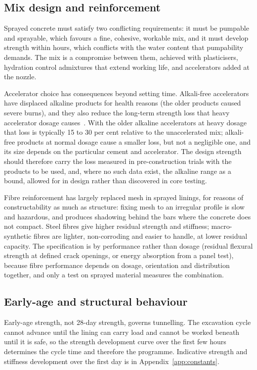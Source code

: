 \subsection{Mix design and reinforcement}
\label{sec:shotcrete-mix}

Sprayed concrete must satisfy two conflicting requirements: it must be pumpable
and sprayable, which favours a fine, cohesive, workable mix, and it must
develop strength within hours, which conflicts with the water content that
pumpability demands. The mix is a compromise between them, achieved with
plasticisers, hydration control admixtures that extend working life, and
accelerators added at the nozzle.

Accelerator choice has consequences beyond setting time. Alkali-free
accelerators have displaced alkaline products for health reasons (the older
products caused severe burns), and they also reduce the long-term strength
loss that heavy accelerator dosage causes~\citep{thomas2009scl}. With the
older alkaline accelerators at heavy dosage that loss is typically 15 to 30
per cent relative to the unaccelerated mix; alkali-free products at normal
dosage cause a smaller loss, but not a negligible one, and its size depends
on the particular cement and accelerator. The design strength should
therefore carry the loss measured in pre-construction trials with the
products to be used, and, where no such data exist, the alkaline range as a
bound, allowed for in design rather than discovered in core testing.

Fibre reinforcement has largely replaced mesh in sprayed linings, for reasons
of constructability as much as structure: fixing mesh to an irregular
profile is slow and hazardous, and produces shadowing behind the bars where the
concrete does not compact. Steel fibres give higher residual strength and
stiffness; macro-synthetic fibres are lighter, non-corroding and easier to
handle, at lower residual capacity. The specification is by performance rather than
dosage (residual flexural strength at defined crack openings, or
energy absorption from a panel test), because fibre performance depends on
dosage, orientation and distribution together, and only a test on sprayed
material measures the combination.

\subsection{Early-age and structural behaviour}
\label{sec:shotcrete-early-age}

Early-age strength, not 28-day strength, governs tunnelling. The excavation
cycle cannot advance until the lining can carry load and cannot be worked
beneath until it is safe, so the strength development curve over the first few
hours determines the cycle time and therefore the programme. Indicative
strength and stiffness development over the first day is in
Appendix~\ref{app:constants}.

